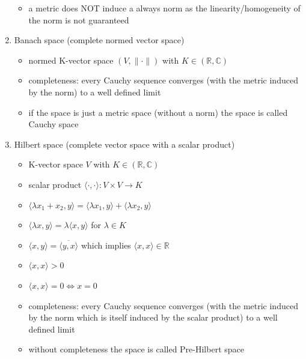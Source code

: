 \documentclass[10pt,a4paper]{book}
\theoremstyle{definition}
\begin{document}
\begin{enumerate}
\begin{itemize}
            \item a metric does NOT induce a always norm as the linearity/homogeneity of the norm is not guaranteed 
        \end{itemize}
    \item Banach space (complete normed vector space)
        \begin{itemize}
            \item normed K-vector space $(V,\|\cdot\|)$ with $K\in(\mathbb{R}, \mathbb{C})$
            \item completeness: every Cauchy sequence converges (with the metric induced by the norm) to a well defined limit
            \item if the space is just a metric space (without a norm) the space is called Cauchy space
        \end{itemize}
    \item Hilbert space (complete vector space with a scalar product)
        \begin{itemize}
            \item K-vector space $V$ with $K\in(\mathbb{R}, \mathbb{C})$
            \item scalar product $\langle\cdot,\cdot\rangle:V\times V\rightarrow K$
            \item $\langle \lambda x_1+x_2,y\rangle = \langle \lambda x_1,y\rangle + \langle \lambda x_2,y\rangle$
            \item $\langle \lambda x,y\rangle = \lambda\langle x,y\rangle$ for $\lambda\in K$
            \item $\langle x,y\rangle=\overline{\langle y,x\rangle}$ which implies $\langle x,x\rangle \in \mathbb{R}$
            \item $\langle x,x\rangle>0$
            \item $\langle x,x\rangle=0\Leftrightarrow x=0$
            \item completeness: every Cauchy sequence converges (with the metric induced by the norm which is itself induced by the scalar product) to a well defined limit
            \item without completeness the space is called Pre-Hilbert space
        \end{itemize}
\end{enumerate}
\end{document}
